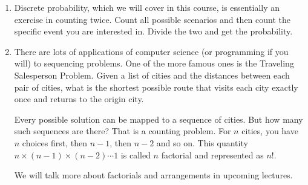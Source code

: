 \documentclass[12pt]{article}
\begin{document}
\begin{enumerate}
\item Discrete probability, which we will cover in this course, is essentially an exercise in counting twice. Count all possible scenarios and then count the specific event you are interested in. Divide the two and get the probability.
\item There are lots of applications of computer science (or programming if you will) to sequencing problems. One of the more famous ones is the Traveling Salesperson Problem.  Given a list of cities and the distances between each pair of cities, what is the shortest possible route that visits each city exactly once and returns to the origin city. 

Every possible solution can be mapped to a sequence of cities. But how many such sequences are there? That is a counting problem. For $n$ cities, you have $n$ choices first, then $n-1$, then $n-2$ and so on. This quantity $n \times (n-1) \times (n-2) \cdots 1$ is called $n$ factorial and represented as $n!$. 

We will talk more about factorials and arrangements in upcoming lectures.

%
%
%
% 
% 
% 
%
%
%
%
%
%
%

\end{enumerate}
\end{document}
